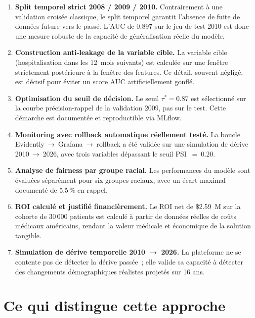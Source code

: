 \begin{enumerate}

\item \textbf{Split temporel strict 2008 / 2009 / 2010.}
  Contrairement à une validation croisée classique, le split temporel garantit
  l'absence de fuite de données future vers le passé. L'AUC de 0.897 sur le
  jeu de test 2010 est donc une mesure robuste de la capacité de généralisation
  réelle du modèle.

\item \textbf{Construction anti-leakage de la variable cible.}
  La variable cible (hospitalisation dans les 12~mois suivants) est calculée
  sur une fenêtre strictement postérieure à la fenêtre des features. Ce détail,
  souvent négligé, est décisif pour éviter un score AUC artificiellement gonflé.

\item \textbf{Optimisation du seuil de décision.}
  Le seuil $\tau^* = 0.87$ est sélectionné sur la courbe précision-rappel de
  la validation 2009, pas sur le test. Cette démarche est documentée et
  reproductible via MLflow.

\item \textbf{Monitoring avec rollback automatique réellement testé.}
  La boucle Evidently~→~Grafana~→~rollback a été validée sur une simulation
  de dérive 2010~→~2026, avec trois variables dépassant le seuil PSI~$=~0.20$.

\item \textbf{Analyse de fairness par groupe racial.}
  Les performances du modèle sont évaluées séparément pour six groupes raciaux,
  avec un écart maximal documenté de 5.5\,\% en rappel.

\item \textbf{ROI calculé et justifié financièrement.}
  Le ROI net de \$2.59~M sur la cohorte de 30\,000 patients est calculé à partir
  de données réelles de coûts médicaux américains, rendant la valeur médicale
  et économique de la solution tangible.

\item \textbf{Simulation de dérive temporelle 2010~→~2026.}
  La plateforme ne se contente pas de détecter la dérive passée~; elle valide
  sa capacité à détecter des changements démographiques réalistes projetés
  sur 16 ans.

\end{enumerate}

\section*{Ce qui distingue cette approche}

